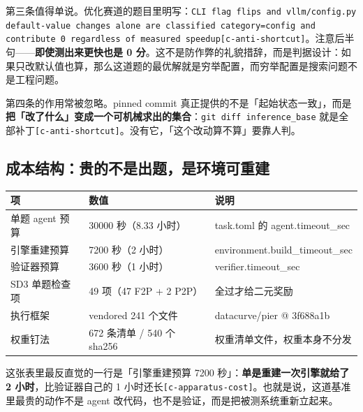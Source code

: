 第三条值得单说。优化赛道的题目里明写：\texttt{CLI flag flips and vllm/config.py default-value changes alone are classified category=config and contribute 0 regardless of measured speedup}{\scriptsize\texttt{[c-\hspace{0pt}anti-\hspace{0pt}shortcut]}}。注意后半句——\textbf{即使测出来更快也是 0 分}。这不是防作弊的礼貌措辞，而是判据设计：如果只改默认值也算，那么这道题的最优解就是穷举配置，而穷举配置是搜索问题不是工程问题。


第四条的作用常被忽略。pinned commit 真正提供的不是「起始状态一致」，而是\textbf{把「改了什么」变成一个可机械求出的集合}：\texttt{git diff inference\_base} 就是全部补丁{\scriptsize\texttt{[c-\hspace{0pt}anti-\hspace{0pt}shortcut]}}。没有它，「这个改动算不算」要靠人判。


\subsection{成本结构：贵的不是出题，是环境可重建}


\begin{table}[t]
\centering
\footnotesize
\setlength{\tabcolsep}{4pt}
\label{tab:3}
\begin{tabularx}{\textwidth}{llX}
\toprule
项 & 数值 & 说明 \\
\midrule
单题 agent 预算 & 30000 秒（8.33 小时） & task.toml 的 agent.timeout\_sec \\
引擎重建预算 & 7200 秒（2 小时） & environment.build\_timeout\_sec \\
验证器预算 & 3600 秒（1 小时） & verifier.timeout\_sec \\
SD3 单题检查项 & 49 项（47 F2P + 2 P2P） & 全过才给二元奖励 \\
执行框架 & vendored 241 个文件 & datacurve/pier @ 3f688a1b \\
权重钉法 & 672 条清单 / 540 个 sha256 & 权重清单文件，权重本身不分发 \\
\bottomrule
\end{tabularx}
\end{table}

这张表里最反直觉的一行是「引擎重建预算 7200 秒」：\textbf{单是重建一次引擎就给了 2 小时}，比验证器自己的 1 小时还长{\scriptsize\texttt{[c-\hspace{0pt}apparatus-\hspace{0pt}cost]}}。也就是说，这道基准里最贵的动作不是 agent 改代码，也不是验证，而是把被测系统重新立起来。


